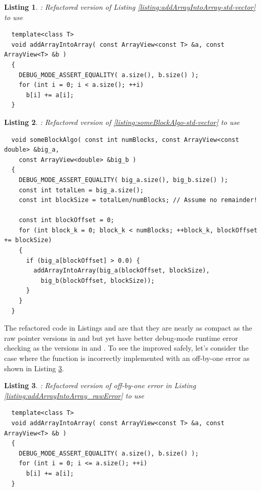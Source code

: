 \documentclass[pdf,ps2pdf,11pt]{SANDreport}
\newtheorem{listing}{Listing}
\begin{document}
\begin{listing}: Refactored version of Listing
  {}\ref{listing:addArrayIntoArray-std-vector} to use {} \\
\label{listing:addArrayIntoArray-ArrayView}
{\small\begin{verbatim}
  template<class T>
  void addArrayIntoArray( const ArrayView<const T> &a, const ArrayView<T> &b )
  {
    DEBUG_MODE_ASSERT_EQUALITY( a.size(), b.size() );
    for (int i = 0; i < a.size(); ++i)
      b[i] += a[i];
  }
\end{verbatim}}
\end{listing}

\begin{listing}: Refactored version of
  {}\ref{listing:someBlockAlgo-std-vector} to use {} \\
\label{listing:someBlockAlgo-ArrayView}
{\small\begin{verbatim}
  void someBlockAlgo( const int numBlocks, const ArrayView<const double> &big_a,
    const ArrayView<double> &big_b )
  {
    DEBUG_MODE_ASSERT_EQUALITY( big_a.size(), big_b.size() );
    const int totalLen = big_a.size();
    const int blockSize = totalLen/numBlocks; // Assume no remainder!
    
    const int blockOffset = 0;
    for (int block_k = 0; block_k < numBlocks; ++block_k, blockOffset += blockSize)
    {
      if (big_a[blockOffset] > 0.0) {
        addArrayIntoArray(big_a(blockOffset, blockSize),
          big_b(blockOffset, blockSize));
      }
    }
  }
\end{verbatim}}
\end{listing}

The refactored code in Listings
{} and
{} are that they are nearly as
compact as the raw pointer versions in
{} and
{} but yet have better debug-mode
runtime error checking as the {} versions in
{} and
{}.  To see the improved
safely, let's consider the case where the
{} function is incorrectly implemented
with an off-by-one error as shown in Listing
{}\ref{listing:addArrayIntoArray-ArrayViewError}.

\begin{listing}: Refactored version of off-by-one error in Listing
  {}\ref{listing:addArrayIntoArray_rawError} to use {} \\
\label{listing:addArrayIntoArray-ArrayViewError}
{\small\begin{verbatim}
  template<class T>
  void addArrayIntoArray( const ArrayView<const T> &a, const ArrayView<T> &b )
  {
    DEBUG_MODE_ASSERT_EQUALITY( a.size(), b.size() );
    for (int i = 0; i <= a.size(); ++i)
      b[i] += a[i];
  }
\end{verbatim}}
\end{listing}
\end{document}
